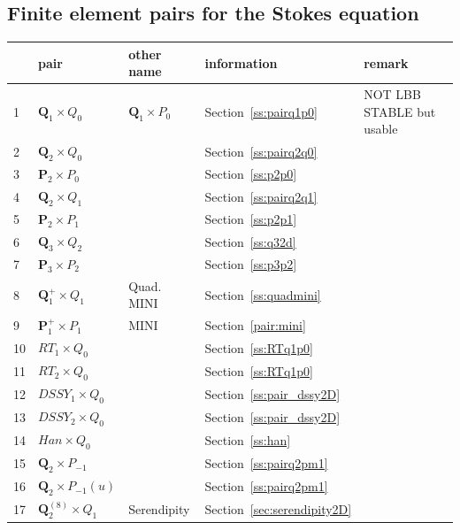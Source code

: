 \subsection*{Finite element pairs for the Stokes equation}

\begin{center}
\begin{tabular}{p{1cm}p{2cm}p{4cm}p{2.5cm}p{5cm}}
\hline
 &pair & other name & information & remark \\
\hline
\hline
 1&${\bm Q}_1\times Q_0$   & ${\bm Q}_1\times P_0$  & Section~\ref{ss:pairq1p0} & NOT LBB STABLE but usable\\
 2&${\bm Q}_2\times Q_0$   &                  & Section~\ref{ss:pairq2q0}\\
 3&${\bm P}_2\times P_0$   &                  & Section~\ref{ss:p2p0}\\ 
 4&${\bm Q}_2\times Q_1$       &                  & Section~\ref{ss:pairq2q1}\\
 5&${\bm P}_2\times P_1$       &                  & Section~\ref{ss:p2p1}\\
 6&${\bm Q}_3\times Q_2$       &                  & Section~\ref{ss:q32d}\\
 7&${\bm P}_3\times P_2$       &                  & Section~\ref{ss:p3p2}\\
 8&${\bm Q}_1^+\times Q_1$     & Quad. MINI       & Section~\ref{ss:quadmini}\\
 9&${\bm P}_1^{+}\times P_{1}$ & MINI             & Section~\ref{pair:mini}\\
10&$RT_1\times Q_0$      &                  & Section~\ref{ss:RTq1p0}\\
11&$RT_2\times Q_0$      &                  & Section~\ref{ss:RTq1p0}\\
12&$DSSY_1\times Q_0$    &                  & Section~\ref{ss:pair_dssy2D}\\
13&$DSSY_2\times Q_0$    &                  & Section~\ref{ss:pair_dssy2D}\\
14&$Han\times Q_0$       &                  & Section~\ref{ss:han}\\
15&${\bm Q}_2\times P_{-1}$    &                  & Section~\ref{ss:pairq2pm1}\\
16&${\bm Q}_2\times P_{-1}(u)$ &                  & Section~\ref{ss:pairq2pm1}\\
17&${\bm Q}_2^{(8)}\times Q_1$ & Serendipity      & Section~\ref{sec:serendipity2D}\\

\end{tabular}
\end{center}
